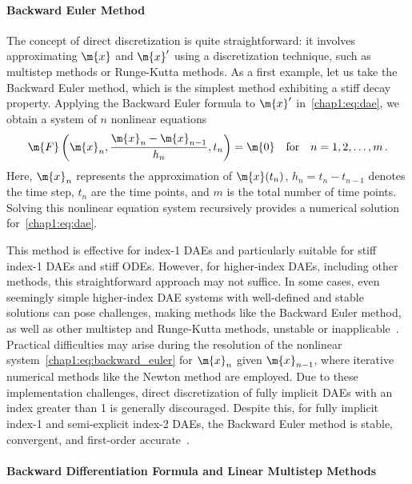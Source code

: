 \paragraph{Backward Euler Method}

The concept of direct discretization is quite straightforward: it involves approximating $\m{x}$ and $\m{x}^{\prime}$ using a discretization technique, such as multistep methods or Runge-Kutta methods. As a first example, let us take the Backward Euler method, which is the simplest method exhibiting a stiff decay property. Applying the Backward Euler formula to $\m{x}^{\prime}$ in~\eqref{chap1:eq:dae}, we obtain a system of $n$ nonlinear equations
\begin{equation}
  \m{F}\left(\m{x}_n, \dfrac{\m{x}_n - \m{x}_{n-1}}{h_n}, t_n\right) = \m{0} \quad \text{for} \quad n = 1, 2, \dots, m \, \text{.}
  \label{chap1:eq:backward_euler}
\end{equation}
%
Here, $\m{x}_n$ represents the approximation of $\m{x}(t_n)$, $h_n = t_n - t_{n-1}$ denotes the time step, $t_n$ are the time points, and $m$ is the total number of time points. Solving this nonlinear equation system recursively provides a numerical solution for~\eqref{chap1:eq:dae}.

This method is effective for index-1 \acp{DAE} and particularly suitable for stiff index-1 \acp{DAE} and stiff \acp{ODE}. However, for higher-index \acp{DAE}, including other methods, this straightforward approach may not suffice. In some cases, even seemingly simple higher-index \ac{DAE} systems with well-defined and stable solutions can pose challenges, making methods like the Backward Euler method, as well as other multistep and Runge-Kutta methods, unstable or inapplicable~\cite{ascher1998computer}. Practical difficulties may arise during the resolution of the nonlinear system~\eqref{chap1:eq:backward_euler} for $\m{x}_n$ given $\m{x}_{n-1}$, where iterative numerical methods like the Newton method are employed. Due to these implementation challenges, direct discretization of fully implicit \acp{DAE} with an index greater than 1 is generally discouraged. Despite this, for fully implicit index-1 and semi-explicit index-2 \acp{DAE}, the Backward Euler method is stable, convergent, and first-order accurate~\cite{brenan1995numerical, hairer1999stiff}.

\paragraph{Backward Differentiation Formula and Linear Multistep Methods}

